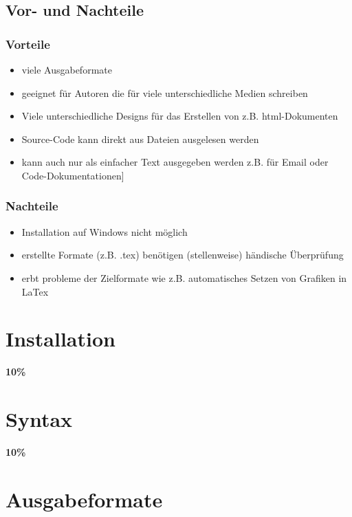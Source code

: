 \documentclass[%
oneside,                 %
final,                   %
chapterprefix=true,      %
open=right,              %
10pt]{book}
\begin{document}
\section{Vor- und Nachteile}
\subsection{Vorteile}
\begin{itemize}
\item viele Ausgabeformate

\item geeignet für Autoren die für viele unterschiedliche Medien schreiben

\item Viele unterschiedliche Designs für das Erstellen von z.B. html-Dokumenten

\item Source-Code kann direkt aus Dateien ausgelesen werden

\item kann auch nur als einfacher Text ausgegeben werden z.B. für Email oder Code-Dokumentationen]
\end{itemize}

\noindent
\subsection{Nachteile}
\begin{itemize}
 \item Installation auf Windows nicht möglich

 \item erstellte Formate (z.B. .tex) benötigen (stellenweise) händische Überprüfung

 \item erbt probleme der Zielformate wie z.B. automatisches Setzen von Grafiken in LaTex
\end{itemize}

\noindent
\chapter{Installation}
\textbf{10\%}
\chapter{Syntax}
\textbf{10\%}
\chapter{Ausgabeformate}
\end{document}
